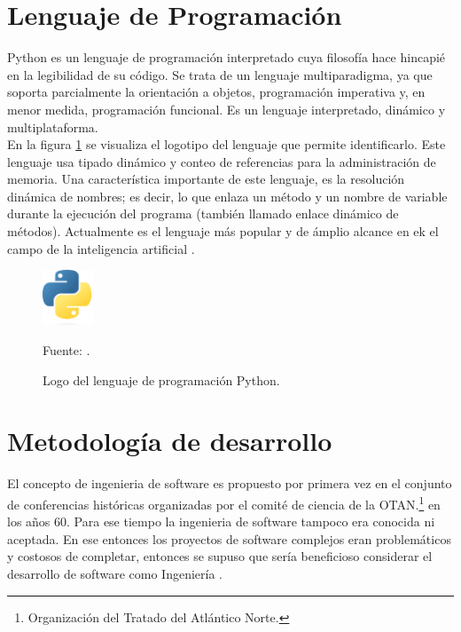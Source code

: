 \section{Lenguaje de Programación}
Python es un lenguaje de programación interpretado cuya filosofía hace hincapié en la legibilidad de su código. Se trata de un lenguaje multiparadigma, ya que soporta parcialmente la orientación a objetos, programación imperativa y, en menor medida, programación funcional. Es un lenguaje interpretado, dinámico y multiplataforma.\\

En la figura \ref{fig:python} se visualiza el logotipo del lenguaje que permite identificarlo. Este lenguaje usa tipado dinámico y conteo de referencias para la administración de memoria. Una característica importante de este lenguaje, es la resolución dinámica de nombres; es decir, lo que enlaza un método y un nombre de variable durante la ejecución del programa (también llamado enlace dinámico de métodos). Actualmente es el lenguaje más popular y de ámplio alcance en ek el campo de la inteligencia artificial \cite{python:popular}.\\

\begin{figure}[H]
    \begin{center}
        \includegraphics[width=1.5cm]{img/capitulo_2/python.png}
    \end{center}
    \begin{center}
        \caption{Logo del lenguaje de programación Python.}
        Fuente: \cite{python}.
        \label{fig:python}
    \end{center}
\end{figure}


\section{Metodología de desarrollo}
El concepto de ingenieria de software es propuesto por primera vez en el conjunto de conferencias históricas organizadas por el comité de ciencia de la OTAN.\footnote{Organización del Tratado del Atlántico Norte.} en los años 60. Para ese tiempo la ingenieria de software tampoco era conocida ni aceptada. En ese entonces los proyectos de software complejos eran problemáticos y costosos de completar, entonces se supuso que sería beneficioso considerar el desarrollo de software como Ingeniería \cite{Ganis}.\\

